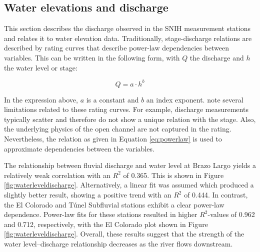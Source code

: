 \subsection{Water elevations and discharge}
This section describes the discharge observed in the SNIH measurement stations and relates it to water elevation data. Traditionally, stage-discharge relations are described by rating curves that describe power-law dependencies between variables. This can be written in the following form, with $Q$ the discharge and $h$ the water level or stage:

\begin{equation}
\label{eq:powerlaw}
    Q = a \cdot h^b
\end{equation}

In the expression above, $a$ is a constant and $b$ an index exponent. \citeauthor{schmidtStageDischargeRelationshipOpen2011} note several limitations related to these rating curves. For example, discharge measurements typically scatter and therefore do not show a unique relation with the stage. Also, the underlying physics of the open channel are not captured in the rating. Nevertheless, the relation as given in Equation \ref{eq:powerlaw} is used to approximate dependencies between the variables. 

The relationship between fluvial discharge and water level at Brazo Largo yields a relatively weak correlation with an $R^2$ of 0.365. This is shown in Figure \ref{fig:waterleveldischarge}. Alternatively, a linear fit was assumed which produced a slightly better result, showing a positive trend with an $R^2$ of 0.444. In contrast, the El Colorado and Túnel Subfluvial stations exhibit a clear power-law dependence. Power-law fits for these stations resulted in higher $R^2$-values of 0.962 and 0.712, respectively, with the El Colorado plot shown in Figure \ref{fig:waterleveldischarge}. Overall, these results suggest that the strength of the water level–discharge relationship decreases as the river flows downstream.



